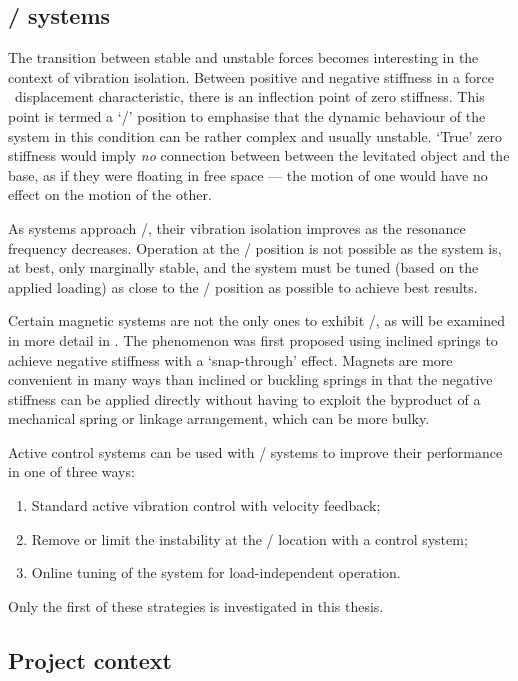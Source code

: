 \documentclass[11pt,a4paper]{memoir}
\begin{document}
\subsection{\QZS/ systems}

The transition between stable and unstable forces becomes interesting in the context of vibration isolation.
Between positive and negative stiffness in a force \vs\ displacement characteristic, there is an inflection point of zero stiffness.
This point is termed a `\qzs/' position to emphasise that the dynamic behaviour of the system in this condition can be rather complex and usually unstable.
`True' zero stiffness would imply \emph{no} connection between between the levitated object and the base, as if they were floating in free space — the motion of one would have no effect on the motion of the other.

As systems approach \qzs/, their vibration isolation improves as the resonance frequency decreases.
Operation at the \qzs/ position is not possible as the system is, at best, only marginally stable, and the system must be tuned (based on the applied loading) as close to the \qzs/ position as possible to achieve best results.

Certain magnetic systems are not the only ones to exhibit \qzs/, as will be examined in more detail in .
The phenomenon was first proposed using inclined springs to achieve negative stiffness with a `snap-through' effect.
Magnets are more convenient in many ways than inclined or buckling springs in that the negative stiffness can be applied directly without having to exploit the byproduct of a mechanical spring or linkage arrangement, which can be more bulky.

Active control systems can be used with \qzs/ systems to improve their performance in one of three ways:
\begin{enumerate}
  \item Standard active vibration control with velocity feedback;
  \item Remove or limit the instability at the \qzs/ location with a control system;
  \item Online tuning of the system for load-independent operation.
\end{enumerate}
Only the first of these strategies is investigated in this thesis.


\subsection{Project context}
\end{document}
